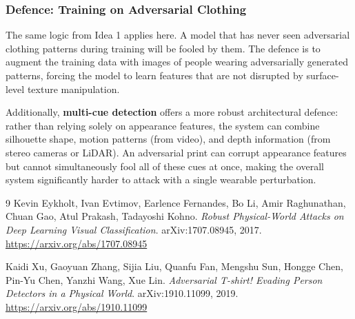 \documentclass[12pt, a4paper]{article}
\begin{document}
\subsubsection*{Defence: Training on Adversarial Clothing}

The same logic from Idea 1 applies here. A model that has never seen
adversarial clothing patterns during training will be fooled by them.
The defence is to augment the training data with images of people
wearing adversarially generated patterns, forcing the model to learn
features that are not disrupted by surface-level texture manipulation.

Additionally, \textbf{multi-cue detection} offers a more robust
architectural defence: rather than relying solely on appearance features,
the system can combine silhouette shape, motion patterns (from video),
and depth information (from stereo cameras or LiDAR). An adversarial
print can corrupt appearance features but cannot simultaneously fool
all of these cues at once, making the overall system significantly
harder to attack with a single wearable perturbation.

\begin{thebibliography}{9}
Kevin Eykholt, Ivan Evtimov, Earlence Fernandes, Bo Li, Amir Raghunathan,
Chuan Gao, Atul Prakash, Tadayoshi Kohno.
\textit{Robust Physical-World Attacks on Deep Learning Visual Classification}.
arXiv:1707.08945, 2017.
\url{https://arxiv.org/abs/1707.08945}

Kaidi Xu, Gaoyuan Zhang, Sijia Liu, Quanfu Fan, Mengshu Sun, Hongge Chen,
Pin-Yu Chen, Yanzhi Wang, Xue Lin.
\textit{Adversarial T-shirt! Evading Person Detectors in a Physical World}.
arXiv:1910.11099, 2019.
\url{https://arxiv.org/abs/1910.11099}
\end{thebibliography}
\end{document}
